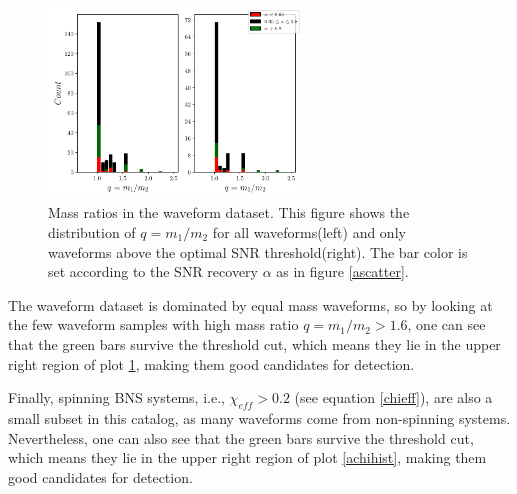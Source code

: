 \begin{figure}[hbt!]
\begin{center}
\includegraphics[width=0.6\textwidth, angle=0]{images/Data_analysis/results/alpha_qhist.pdf}
\captionsetup{width=0.8\textwidth}
\caption[Mass ratios in the waveform dataset]{Mass ratios in the waveform dataset. This figure shows the distribution of $q=m_1/m_2$ for all waveforms(left) and only waveforms above the optimal SNR threshold(right). The bar color is set according to the SNR recovery $\alpha$ as in figure \ref{ascatter}.}
\label{aqhist}
\end{center}
\end{figure}

The waveform dataset is dominated by equal mass waveforms, so by looking at the few waveform samples with high mass ratio $q=m_1/m_2>1.6$, one can see that the green bars survive the threshold cut, which means they lie in the upper right region of plot \ref{aqhist}, making them good candidates for detection.
 

\newpage

Finally, spinning BNS systems, i.e., $\chi_{eff}>0.2$ (see equation \ref{chieff}), are also a small subset in this catalog, as many waveforms come from non-spinning systems. Nevertheless, one can also see that the green bars survive the threshold cut, which means they lie in the upper right region of plot \ref{achihist}, making them good candidates for detection.

